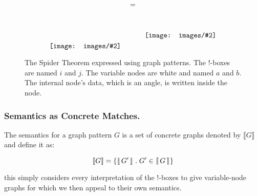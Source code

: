 \documentclass[runningheads]{llncs}
\newcommand{\vinterp}[1]{\lfloor\hspace{-0.27em}|\, #1\, |\hspace{-0.27em}\rfloor}
\newcommand{\binterp}[1]{\lceil\hspace{-0.27em}|\, #1\, |\hspace{-0.27em}\rceil}
\newcommand{\minterp}[1]{\llbracket #1 \rrbracket}
\newcommand{\inlinegraphic}[2]{
  \dimendef\grafheight=255\dimendef\grafvshift=254
  \grafheight=#1
  \grafvshift=-0.5\grafheight
  \advance\grafvshift by 0.5ex
  \raisebox{\grafvshift}{\texttt{[image: images/\#2]}\xspace}
}
\begin{document}
\begin{figure}[t]
$$\begin{array}{ccc}
\inlinegraphic{12em}{spider_lhs_patt} & \;=\; & \inlinegraphic{9em}{spider_rhs_patt}
\end{array}$$
\label{fig:spider-thm-patt}\caption{The Spider Theorem expressed using
  graph patterns. The !-boxes are named $i$ and $j$. The variable
  nodes are white and named $a$ and $b$. The internal node's data,
  which is an angle, is written inside the node.}
\end{figure}





\subsubsection{Semantics as Concrete Matches.}

The semantics for a graph pattern $G$ is a set of concrete graphs
denoted by $\minterp{G}$ and define it as:

$$\minterp{G} = \{\vinterp{G'}\;.\; G' \in \binterp{G}\}$$

\noindent this simply considers every interpretation of the !-boxes to
give variable-node graphs for which we then appeal to their own
semantics. 
\end{document}
